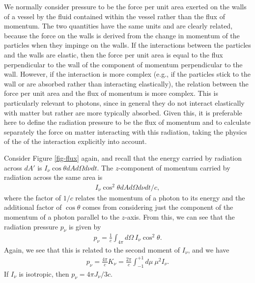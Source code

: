 \newslide

We normally consider pressure to be the force per unit area
exerted on the walls of a vessel by the fluid contained
within the vessel rather than the flux of momentum. The two
quantities have the same units and are clearly related,
because the force on the walls is derived from the change in
momentum of the particles when they impinge on the walls. If the interactions between the particles and the walls are elastic, then the force per unit area is equal to the flux perpendicular to the wall of the component of momentum perpendicular to the wall. However, if the interaction is more complex (e.g., if the particles stick to the wall or are absorbed rather than interacting elastically), the relation between the force per unit area and the flux of momentum is more complex. This is particularly relevant to photons, since in general they do not interact elastically with matter but rather are more typically absorbed. Given this, it is preferable here to define the radiation pressure to be the flux of momentum and to calculate separately the force on matter interacting with this radiation, taking the physics of the of the interaction explicitly into account.


\newslide

Consider Figure
\ref{fig-flux} again, and recall that the energy carried by
radiation across $dA'$ is $I_\nu
\cos\theta dA d\Omega d\nu dt$. The $z$-component of
momentum carried by radiation across the same area is
\begin{align}
I_\nu \cos^2\theta dA d\Omega d\nu dt / c,
\end{align}
where the factor of
$1/c$ relates the momentum of a photon to its energy and the
additional factor of $\cos\theta$ comes from considering
just the component of the momentum of a photon parallel to
the $z$-axis. From this, we can see that the radiation
pressure $p_\nu$ is given by
\begin{align}
p_\nu = \frac{1}{c} \int_{4\pi}\!\!\!d\Omega\:I_\nu
\cos^2\theta.
\end{align}
Again, we see that this is related to the second moment of
$I_\nu$, and we have
\begin{align}
p_\nu= \frac{4\pi}{c} K_\nu =
\frac{2\pi}{c} \int_{-1}^{+1}\!\!\!d\mu\:\mu^2 I_\nu.
\end{align}
If $I_\nu$ is isotropic, then $p_\nu = {4\pi J_\nu / 3c}$.

